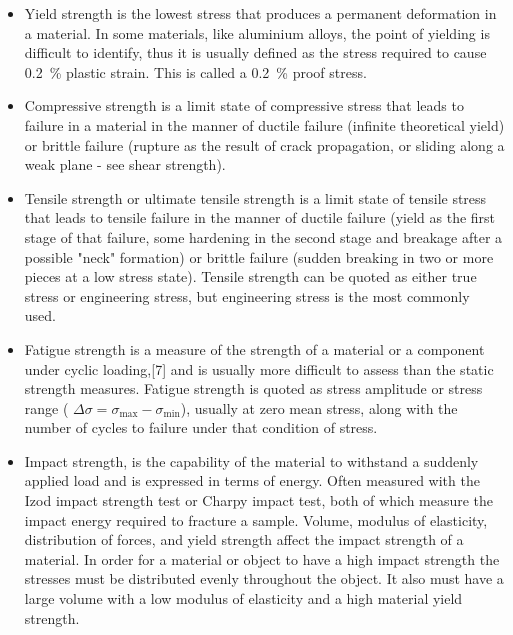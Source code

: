 \begin{itemize}
	\item Yield strength is the lowest stress that produces a permanent deformation in a material. In some materials, like aluminium alloys, the point of yielding is difficult to identify, thus it is usually defined as the stress required to cause \SI{0.2}{\percent} plastic strain. This is called a \SI{0.2}{\percent} proof stress.
	\item Compressive strength is a limit state of compressive stress that leads to failure in a material in the manner of ductile failure (infinite theoretical yield) or brittle failure (rupture as the result of crack propagation, or sliding along a weak plane - see shear strength).
	\item Tensile strength or ultimate tensile strength is a limit state of tensile stress that leads to tensile failure in the manner of ductile failure (yield as the first stage of that failure, some hardening in the second stage and breakage after a possible "neck" formation) or brittle failure (sudden breaking in two or more pieces at a low stress state). Tensile strength can be quoted as either true stress or engineering stress, but engineering stress is the most commonly used.
	\item Fatigue strength is a measure of the strength of a material or a component under cyclic loading,[7] and is usually more difficult to assess than the static strength measures. Fatigue strength is quoted as stress amplitude or stress range ( $ \Delta\sigma= \sigma_\mathrm{max} - \sigma_\mathrm{min} $), usually at zero mean stress, along with the number of cycles to failure under that condition of stress.
	\item Impact strength, is the capability of the material to withstand a suddenly applied load and is expressed in terms of energy. Often measured with the Izod impact strength test or Charpy impact test, both of which measure the impact energy required to fracture a sample. Volume, modulus of elasticity, distribution of forces, and yield strength affect the impact strength of a material. In order for a material or object to have a high impact strength the stresses must be distributed evenly throughout the object. It also must have a large volume with a low modulus of elasticity and a high material yield strength.
\end{itemize}

